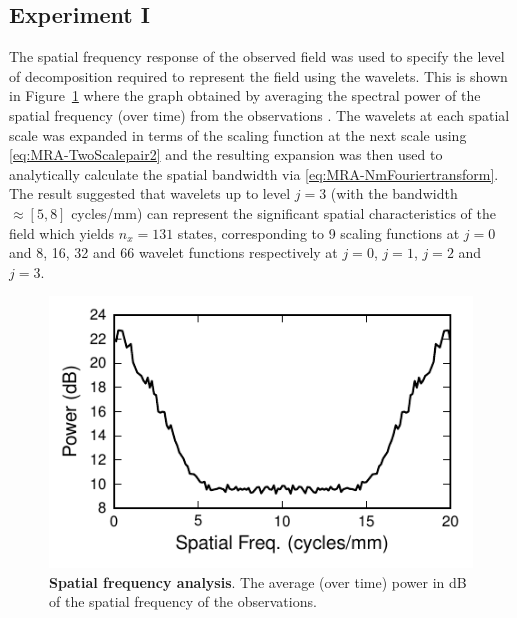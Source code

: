\documentclass[11pt,draftcls,onecolumn,peerreview]{IEEEtran}
\begin{document}
\subsection{Experiment I}
The spatial frequency response of the observed field was used to specify the level of decomposition required to represent the field using the wavelets. This is shown in Figure~\ref{fig:ObservationFrequencyResponce} where the graph obtained by averaging the spectral power of the spatial frequency (over time) from the observations \cite{Scerri2009}. The wavelets at each spatial scale was expanded in terms of the scaling function at the next scale using \eqref{eq:MRA-TwoScalepair2} and the resulting expansion was then used to analytically calculate the spatial bandwidth  via \eqref{eq:MRA-NmFouriertransform}. The result suggested that wavelets up to level $j=3$ (with the bandwidth $\approx[5,8]$ cycles/mm) can represent the significant spatial characteristics of the field which yields $n_x = 131$ states, corresponding to 9 scaling functions at $j=0$ and 8, 16, 32 and 66 wavelet functions respectively at $j=0$, $j=1$, $j=2$ and $j=3$. 
\begin{figure}[!h] 
 	\centering
 		\includegraphics[scale=1]{./Graph/Figure2.pdf}
 		\caption{{\bf Spatial frequency analysis}. The average (over time) power in dB of the spatial frequency of the observations.}
 	\label{fig:ObservationFrequencyResponce}
 \end{figure}
\end{document}
